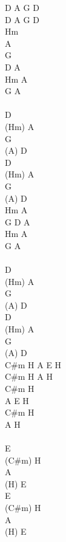 \begin{chord}
D A G D\\
D A G D\\
Hm\\
A\\
G\\
D A\\
Hm A\\
G A\\

\vin \\
D\\
(Hm) A\\
G\\
(A) D\\
D\\
(Hm) A\\
G\\
(A) D\\

Hm A\\
G D A\\
Hm A\\
G A\\

\vin \\
D\\
(Hm) A\\
G\\
(A) D\\
D\\
(Hm) A\\
G\\
(A) D\\

C#m H A E H\\
C#m H A H\\
C#m H\\
A E H\\
C#m H\\
A H\\

\vin \\
E\\
(C#m) H\\
A\\
(H) E\\
E\\
(C#m) H\\
A\\
(H) E\\
\end{chord}
